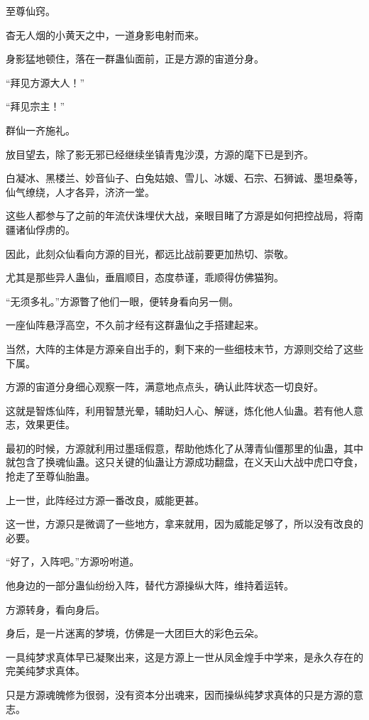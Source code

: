 
\begin{this_body}

至尊仙窍。

杳无人烟的小黄天之中，一道身影电射而来。

身影猛地顿住，落在一群蛊仙面前，正是方源的宙道分身。

“拜见方源大人！”

“拜见宗主！”

群仙一齐施礼。

放目望去，除了影无邪已经继续坐镇青鬼沙漠，方源的麾下已是到齐。

白凝冰、黑楼兰、妙音仙子、白兔姑娘、雪儿、冰媛、石宗、石狮诚、墨坦桑等，仙气缭绕，人才各异，济济一堂。

这些人都参与了之前的年流伏诛埋伏大战，亲眼目睹了方源是如何把控战局，将南疆诸仙俘虏的。

因此，此刻众仙看向方源的目光，都远比战前要更加热切、崇敬。

尤其是那些异人蛊仙，垂眉顺目，态度恭谨，乖顺得仿佛猫狗。

“无须多礼。”方源瞥了他们一眼，便转身看向另一侧。

一座仙阵悬浮高空，不久前才经有这群蛊仙之手搭建起来。

当然，大阵的主体是方源亲自出手的，剩下来的一些细枝末节，方源则交给了这些下属。

方源的宙道分身细心观察一阵，满意地点点头，确认此阵状态一切良好。

这就是智炼仙阵，利用智慧光晕，辅助妇人心、解谜，炼化他人仙蛊。若有他人意志，效果更佳。

最初的时候，方源就利用过墨瑶假意，帮助他炼化了从薄青仙僵那里的仙蛊，其中就包含了换魂仙蛊。这只关键的仙蛊让方源成功翻盘，在义天山大战中虎口夺食，抢走了至尊仙胎蛊。

上一世，此阵经过方源一番改良，威能更甚。

这一世，方源只是微调了一些地方，拿来就用，因为威能足够了，所以没有改良的必要。

“好了，入阵吧。”方源吩咐道。

他身边的一部分蛊仙纷纷入阵，替代方源操纵大阵，维持着运转。

方源转身，看向身后。

身后，是一片迷离的梦境，仿佛是一大团巨大的彩色云朵。

一具纯梦求真体早已凝聚出来，这是方源上一世从凤金煌手中学来，是永久存在的完美纯梦求真体。

只是方源魂魄修为很弱，没有资本分出魂来，因而操纵纯梦求真体的只是方源的意志。


\end{this_body}
